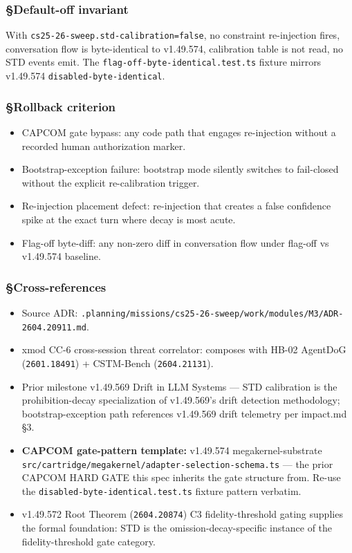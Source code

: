 \documentclass[11pt,letterpaper]{article}
\newcommand{\arxivid}[1]{\texttt{\textcolor{accent}{#1}}}
\providecommand{\tightlist}{\setlength{\itemsep}{0pt}\setlength{\parskip}{0pt}}
\begin{document}
\subsubsection{§Default-off invariant}

With \texttt{cs25-26-sweep.std-calibration=false}, no constraint
re-injection fires, conversation flow is byte-identical to v1.49.574,
calibration table is not read, no STD events emit. The
\texttt{flag-off-byte-identical.test.ts} fixture mirrors v1.49.574
\texttt{disabled-byte-identical}.

\subsubsection{§Rollback criterion}

\begin{itemize}
\tightlist
\item
  CAPCOM gate bypass: any code path that engages re-injection without a
  recorded human authorization marker.
\item
  Bootstrap-exception failure: bootstrap mode silently switches to
  fail-closed without the explicit re-calibration trigger.
\item
  Re-injection placement defect: re-injection that creates a false
  confidence spike at the exact turn where decay is most acute.
\item
  Flag-off byte-diff: any non-zero diff in conversation flow under
  flag-off vs v1.49.574 baseline.
\end{itemize}

\subsubsection{§Cross-references}

\begin{itemize}
\tightlist
\item
  Source ADR:
  \texttt{.planning/missions/cs25-26-sweep/work/modules/M3/ADR-\arxivid{2604.20911}.md}.
\item
  xmod CC-6 cross-session threat correlator: composes with HB-02
  AgentDoG (\arxivid{2601.18491}) + CSTM-Bench (\arxivid{2604.21131}).
\item
  Prior milestone v1.49.569 Drift in LLM Systems --- STD calibration is
  the prohibition-decay specialization of v1.49.569's drift detection
  methodology; bootstrap-exception path references v1.49.569 drift
  telemetry per impact.md §3.
\item
  \textbf{CAPCOM gate-pattern template:} v1.49.574 megakernel-substrate
  \texttt{src/cartridge/megakernel/adapter-selection-schema.ts} --- the
  prior CAPCOM HARD GATE this spec inherits the gate structure from.
  Re-use the \texttt{disabled-byte-identical.test.ts} fixture pattern
  verbatim.
\item
  v1.49.572 Root Theorem (\arxivid{2604.20874}) C3 fidelity-threshold
  gating supplies the formal foundation: STD is the
  omission-decay-specific instance of the fidelity-threshold gate
  category.
\end{itemize}
\end{document}
